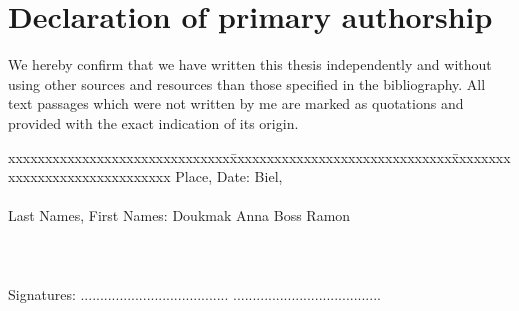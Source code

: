 \chapter*{Declaration of primary authorship}
\label{chap:declaration_authorship}

\vspace*{10mm} 

We hereby confirm that we have written this thesis independently and without using other sources and resources than those specified in the bibliography.
All text passages which were not written by me are marked as quotations and provided with the exact indication of its origin. 

\vspace{15mm}

\begin{tabbing}
xxxxxxxxxxxxxxxxxxxxxxxxxxxxxx\=xxxxxxxxxxxxxxxxxxxxxxxxxxxxxx\=xxxxxxxxxxxxxxxxxxxxxxxxxxxxxx\kill
Place, Date:		\> Biel, \versiondate \\ \\ 
Last Names, First Names:	\> Doukmak Anna 	\> Boss Ramon \\ \\ \\ \\ 
Signatures:	\> ......................................\> ...................................... \\
\end{tabbing}
